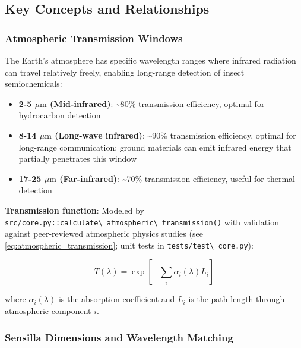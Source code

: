 \documentclass[
  13pt,
  a4paperpaper,
  12pt]{article}
\newcommand{\passthrough}[1]{#1}
\providecommand{\tightlist}{%
  \setlength{\itemsep}{0pt}\setlength{\parskip}{0pt}}
\begin{document}
\subsection{Key Concepts and
Relationships}\label{key-concepts-and-relationships}

\subsubsection{Atmospheric Transmission
Windows}\label{atmospheric-transmission-windows}

The Earth's atmosphere has specific wavelength ranges where infrared
radiation can travel relatively freely, enabling long-range detection of
insect semiochemicals:

\begin{itemize}
\tightlist
\item
  \textbf{2-5 \(\mu\mathrm{m}\) (Mid-infrared)}: \textasciitilde80\%
  transmission efficiency, optimal for hydrocarbon detection
\item
  \textbf{8-14 \(\mu\mathrm{m}\) (Long-wave infrared)}:
  \textasciitilde90\% transmission efficiency, optimal for long-range
  communication; ground materials can emit infrared energy that
  partially penetrates this window
\item
  \textbf{17-25 \(\mu\mathrm{m}\) (Far-infrared)}: \textasciitilde70\%
  transmission efficiency, useful for thermal detection
\end{itemize}

\textbf{Transmission function}: Modeled by
\passthrough{\lstinline!src/core.py::calculate\_atmospheric\_transmission()!}
with validation against peer-reviewed atmospheric physics studies (see
\eqref{eq:atmospheric_transmission}; unit tests in
\passthrough{\lstinline!tests/test\_core.py!}):

\begin{equation}
T(\lambda) = \exp\left[-\sum_i \alpha_i(\lambda) L_i\right]
\label{eq:transmission_function_gloss}
\end{equation}

where \(\alpha_i(\lambda)\) is the absorption coefficient and \(L_i\) is
the path length through atmospheric component \(i\).

\subsubsection{Sensilla Dimensions and Wavelength
Matching}\label{sensilla-dimensions-and-wavelength-matching}
\end{document}
